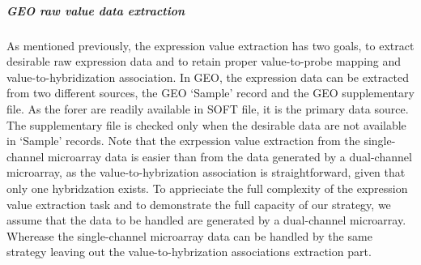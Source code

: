 







\subparagraph{GEO raw value data extraction}


As mentioned previously, the expression value extraction has two goals, to
extract desirable raw expression data and to retain proper value-to-probe
mapping and value-to-hybridization association.
%
In GEO, the expression data can be extracted from two different sources, the
GEO `Sample' record and the GEO supplementary file.
%
As the forer are readily available in SOFT file, it is the primary data
source.  The supplementary file is checked only when the desirable data are
not available in `Sample' records.
%
Note that the exrpession value extraction from the single-channel microarray
data is easier than from the data generated by a dual-channel microarray, as
the value-to-hybrization association is straightforward, given that only one
hybridzation exists.
%
To apprieciate the full complexity of the expression value extraction task
and to demonstrate the full capacity of our strategy, we assume that the data
to be handled are generated by a dual-channel microarray.  
%
Wherease the single-channel microarray data can be handled by the same
strategy leaving out the value-to-hybrization associations extraction part.

